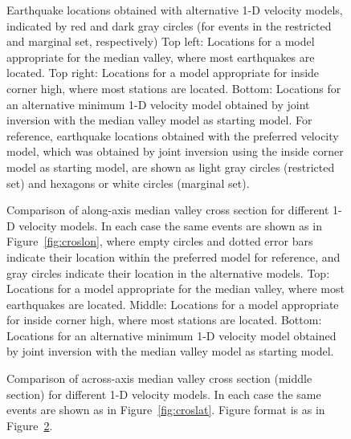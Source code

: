 \documentclass[jgr]{aguplus}
\newlength{\tw}
\begin{document}
\begin{figure}

\setlength{\figarrwidth}{0.5\tw}



\caption{Earthquake locations obtained with alternative 1-D velocity
models, indicated by  red and dark gray circles (for events in the
restricted and marginal set, respectively)
Top left: Locations for a model appropriate for the median valley, where most
earthquakes are located.
Top right: Locations for a model appropriate for inside corner high, where most
stations are located.
Bottom: Locations for an alternative minimum 1-D velocity model
obtained by joint inversion with the median valley model as starting
model.
  For reference, earthquake locations obtained with the
preferred velocity model, which was obtained by joint inversion using
the inside corner model as starting model, are shown as
 light gray circles  (restricted set) and hexagons or white circles
(marginal set). }
\label{fig:mapvar}
\end{figure}


\begin{figure}




\caption{Comparison of along-axis median valley cross section for different 1-D velocity
models.  In each case the same events are shown as in
Figure~\ref{fig:croslon}, where empty circles and dotted error bars
indicate their location within the preferred model for reference, and
gray circles indicate their location in the alternative models.
Top: Locations for a model appropriate for the median valley, where most
earthquakes are located.
Middle: Locations for a model appropriate for inside corner high, where most
stations are located.
Bottom: Locations for an alternative minimum 1-D velocity model
obtained by joint inversion with the median valley model as starting
model.}
\label{fig:croslonvar}
\end{figure}

\begin{figure}




\caption{Comparison of across-axis median valley cross section (middle
section) for different 1-D velocity
models.  In each case the same events are shown as in
Figure~\ref{fig:croslat}.  Figure format is as in Figure~\ref{fig:croslonvar}.}
\label{fig:croslatvar}
\end{figure}
\end{document}
